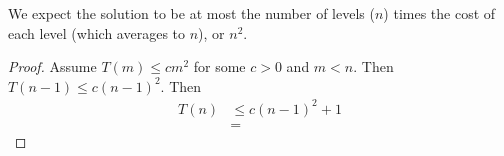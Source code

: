 \documentclass{abrice}
\begin{document}
\noindent
We expect the solution to be at most the number of levels ($n$) times the cost
of each level (which averages to $n$), or $n^2$.

\begin{proof}
  Assume $T(m) \leq cm^2$ for some $c > 0$ and $m < n$. Then
  $T(n - 1) \leq c {(n - 1)}^2$. Then
  \begin{align*}
    T(n) &\leq c{(n - 1)}^2 + 1 \\
    &=
  \end{align*}
\end{proof}
\end{document}

